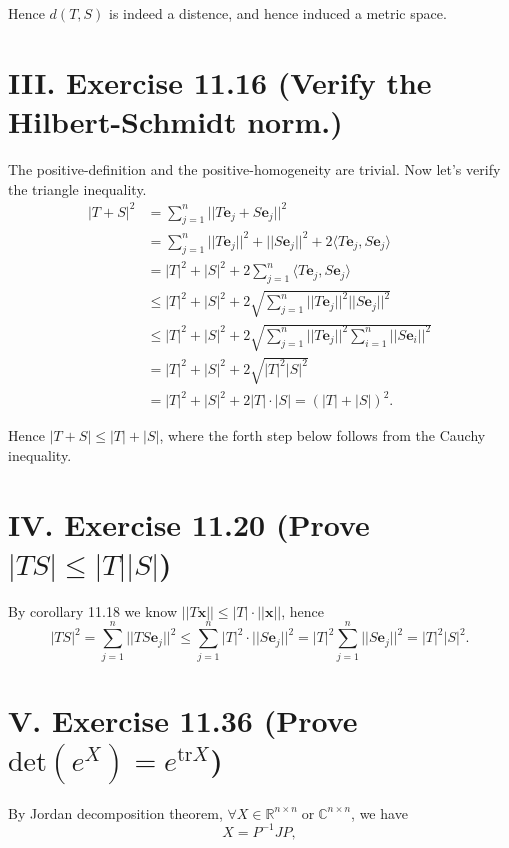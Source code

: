 \documentclass[twoside,a4paper]{article}
\begin{document}
Hence $d(T,S)$ is indeed a distence, and hence induced a metric space.

\section*{III. Exercise 11.16 (Verify the Hilbert-Schmidt norm.)}

\;\;\;\; The positive-definition and the positive-homogeneity are trivial. Now let's verify the triangle inequality.
\begin{align*}
    |T+S|^2 &= \sum_{j=1}^n ||T\mathbf{e}_j+S\mathbf{e}_j||^2\\
    &= \sum_{j=1}^n ||T\mathbf{e}_j||^2+||S\mathbf{e}_j||^2+2\langle T\mathbf{e}_j,S\mathbf{e}_j \rangle\\
    &= |T|^2 + |S|^2 + 2\sum_{j=1}^n\langle T\mathbf{e}_j,S\mathbf{e}_j \rangle\\
    &\leq |T|^2 + |S|^2 + 2\sqrt{\sum_{j=1}^n ||T\mathbf{e}_j||^2||S\mathbf{e}_j||^2}\\
    &\leq |T|^2 + |S|^2 + 2\sqrt{\sum_{j=1}^n ||T\mathbf{e}_j||^2\sum_{i=1}^n||S\mathbf{e}_i||^2}\\
    &=|T|^2 + |S|^2 + 2\sqrt{|T|^2|S|^2}\\
    &=|T|^2 + |S|^2 + 2|T|\cdot|S| =(|T|+|S|)^2.
\end{align*}

Hence $|T+S|\leq |T|+|S|$, where the forth step below follows from the Cauchy inequality.

\section*{IV. Exercise 11.20 (Prove $|TS|\leq |T||S|$)}

\;\;\;\; By corollary 11.18 we know $||T\mathbf{x}||\leq |T|\cdot ||\mathbf{x}||$, hence
\begin{equation*}
    |TS|^2=\sum_{j=1}^n||TS\mathbf{e}_j||^2\leq \sum_{j=1}^n|T|^2\cdot ||S\mathbf{e}_j||^2=|T|^2\sum_{j=1}^n ||S\mathbf{e}_j||^2=|T|^2|S|^2.
\end{equation*}

\section*{V. Exercise 11.36 (Prove $\text{det}(e^X)=e^{\text{tr} X}$)}

\;\;\;\; By Jordan decomposition theorem, $\forall X\in\mathbb{R}^{n\times n}\;\text{or}\;\mathbb{C}^{n\times n}$, we have
\begin{equation*}
    X=P^{-1}JP,
\end{equation*}
\end{document}
